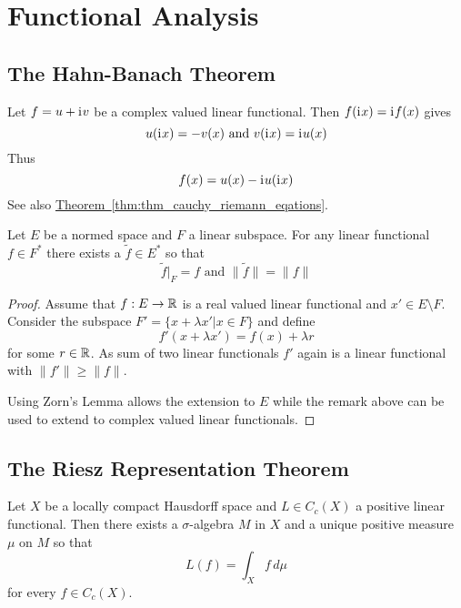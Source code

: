 \newpage
\section{Functional Analysis}

\subsection{The Hahn-Banach Theorem}

\begin{remark}
    Let \( f = u + \mathrm{i}\mkern1mu v\) be a complex valued linear functional. Then \( f(\mathrm{i}\mkern1mu x) = \mathrm{i}\mkern1mu f(x) \) gives 
    \[
            u(\mathrm{i}\mkern1mu x) = -v(x) \text{ and } v(\mathrm{i}\mkern1mu x) = \mathrm{i}\mkern1mu u(x) 
    \] 
    Thus 
    \[
        f(x) = u(x) - \mathrm{i}\mkern1mu u(\mathrm{i}\mkern1mu x)
    \]
    See also \hyperref[thm:thm_cauchy_riemann_eqations]{Theorem~\ref*{thm:thm_cauchy_riemann_eqations}}.
\end{remark}
\bigskip


\begin{theorem}\label{thm:hahn_banach}
    Let \( E \) be a normed space and \( F \) a linear subspace. For any linear functional 
    \( f \in F^* \) there exists a \( \tilde{f} \in E^* \) so that
    \[
        \tilde{f}|_F = f \text{ and } \|\tilde{f}\| = \|f\|
    \]
\end{theorem}

\begin{proof}
    Assume that \( f: E \to \mathbb{R} \) is a real valued linear functional and \( x' \in E \setminus F \).
    Consider the subspace \( F' = \{x + \lambda x' | x \in F \} \) and define 
    \[
        f'(x + \lambda x') = f(x) + \lambda r 
    \]
    for some \( r \in \mathbb{R} \).  As sum of two linear functionals \( f' \) again is a linear functional with 
    \( \|f'\| \ge \|f\| \).
    
    Using Zorn's Lemma allows the extension to \( E \) while the remark above can be used to extend 
    to complex valued linear functionals.
\end{proof}
\bigskip


\subsection{The Riesz Representation Theorem}

\begin{theorem}\label{thm:riesz_representation}
Let \( X \) be a locally compact Hausdorff space and \( L \in C_c(X) \) a positive linear functional. Then there
exists a \( \sigma \)-algebra \( M \) in \( X \) and a unique positive measure \( \mu \) on \( M \) so that
\[
    L(f) = \int_X f\,d\mu
\]
for every \( f \in C_c(X) \).
\end{theorem}
\bigskip
